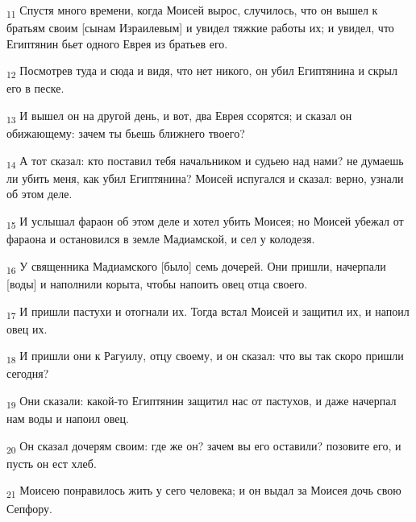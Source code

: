 \begin{tcolorbox}
\textsubscript{11} Спустя много времени, когда Моисей вырос, случилось, что он вышел к братьям своим [сынам Израилевым] и увидел тяжкие работы их; и увидел, что Египтянин бьет одного Еврея из братьев его.
\end{tcolorbox}
\begin{tcolorbox}
\textsubscript{12} Посмотрев туда и сюда и видя, что нет никого, он убил Египтянина и скрыл его в песке.
\end{tcolorbox}
\begin{tcolorbox}
\textsubscript{13} И вышел он на другой день, и вот, два Еврея ссорятся; и сказал он обижающему: зачем ты бьешь ближнего твоего?
\end{tcolorbox}
\begin{tcolorbox}
\textsubscript{14} А тот сказал: кто поставил тебя начальником и судьею над нами? не думаешь ли убить меня, как убил Египтянина? Моисей испугался и сказал: верно, узнали об этом деле.
\end{tcolorbox}
\begin{tcolorbox}
\textsubscript{15} И услышал фараон об этом деле и хотел убить Моисея; но Моисей убежал от фараона и остановился в земле Мадиамской, и сел у колодезя.
\end{tcolorbox}
\begin{tcolorbox}
\textsubscript{16} У священника Мадиамского [было] семь дочерей. Они пришли, начерпали [воды] и наполнили корыта, чтобы напоить овец отца своего.
\end{tcolorbox}
\begin{tcolorbox}
\textsubscript{17} И пришли пастухи и отогнали их. Тогда встал Моисей и защитил их, и напоил овец их.
\end{tcolorbox}
\begin{tcolorbox}
\textsubscript{18} И пришли они к Рагуилу, отцу своему, и он сказал: что вы так скоро пришли сегодня?
\end{tcolorbox}
\begin{tcolorbox}
\textsubscript{19} Они сказали: какой-то Египтянин защитил нас от пастухов, и даже начерпал нам воды и напоил овец.
\end{tcolorbox}
\begin{tcolorbox}
\textsubscript{20} Он сказал дочерям своим: где же он? зачем вы его оставили? позовите его, и пусть он ест хлеб.
\end{tcolorbox}
\begin{tcolorbox}
\textsubscript{21} Моисею понравилось жить у сего человека; и он выдал за Моисея дочь свою Сепфору.
\end{tcolorbox}
